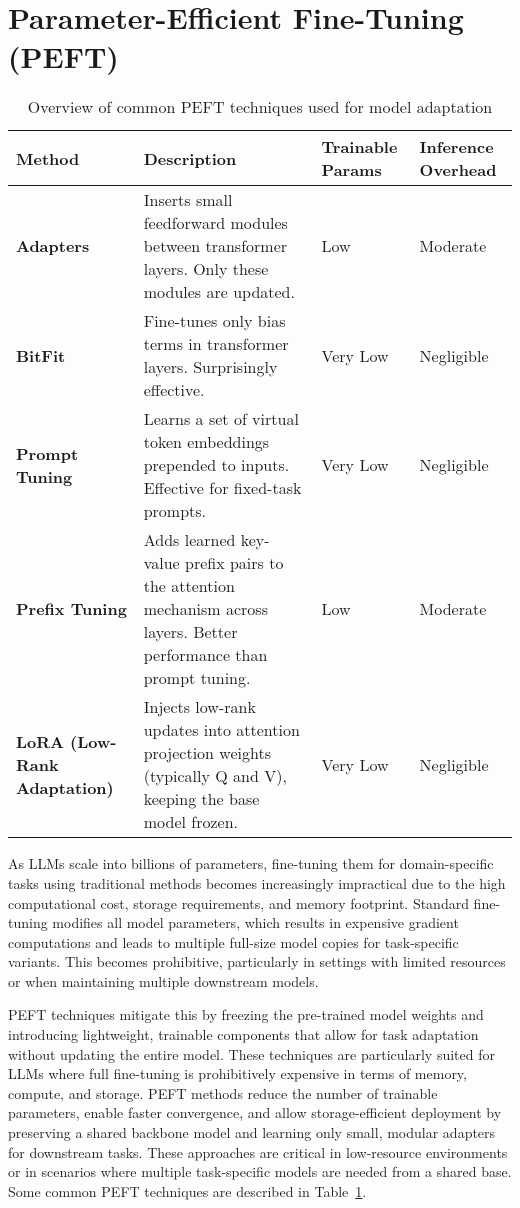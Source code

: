 \section{Parameter-Efficient Fine-Tuning (PEFT)}

\begin{table}[t]
  \centering
  \scriptsize
  \begin{tabularx}{0.95\textwidth}{
    >{\raggedright\arraybackslash}p{3cm}
    >{\raggedright\arraybackslash}X
    >{\centering\arraybackslash}p{2cm}
    >{\centering\arraybackslash}p{2cm}
  }
    \toprule
    \textbf{Method} & \textbf{Description} & \textbf{Trainable Params} & \textbf{Inference Overhead} \\
    \midrule
    \textbf{Adapters} & Inserts small feedforward modules between transformer layers. Only these modules are updated. & Low & Moderate \\
    \textbf{BitFit} & Fine-tunes only bias terms in transformer layers. Surprisingly effective. & Very Low & Negligible \\
    \textbf{Prompt Tuning} & Learns a set of virtual token embeddings prepended to inputs. Effective for fixed-task prompts. & Very Low & Negligible \\
    \textbf{Prefix Tuning} & Adds learned key-value prefix pairs to the attention mechanism across layers. Better performance than prompt tuning. & Low & Moderate \\
    \textbf{LoRA (Low-Rank Adaptation)} & Injects low-rank updates into attention projection weights (typically Q and V), keeping the base model frozen. & Very Low & Negligible \\
    \bottomrule
  \end{tabularx}
  \caption{Overview of common PEFT techniques used for model adaptation}
  \label{table:common_peft}
\end{table}

As LLMs scale into billions of parameters, fine-tuning them for domain-specific tasks
using traditional methods becomes increasingly impractical due to the high computational
cost, storage requirements, and memory footprint. Standard fine-tuning modifies
all model parameters, which results in expensive gradient computations and leads to multiple
full-size model copies for task-specific variants. This becomes prohibitive, particularly
in settings with limited resources or when maintaining multiple downstream models.

PEFT techniques mitigate this by freezing the pre-trained model weights and introducing
lightweight, trainable components that allow for task adaptation without updating the
entire model. These techniques are particularly suited for LLMs where full fine-tuning is
prohibitively expensive in terms of memory, compute, and storage. PEFT methods reduce
the number of trainable parameters, enable faster convergence, and allow storage-efficient
deployment by preserving a shared backbone model and learning only small, modular
adapters for downstream tasks. These approaches are critical in low-resource environments
or in scenarios where multiple task-specific models are needed from a shared base.
Some common PEFT techniques are described in Table~\ref{table:common_peft}.

